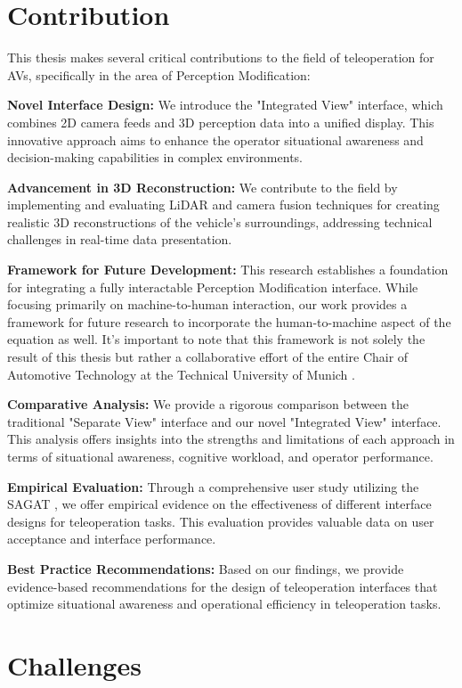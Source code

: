 \section{Contribution}
This thesis makes several critical contributions to the field of teleoperation for \acp{AV}, specifically in the area of Perception Modification:

\textbf{Novel Interface Design:}
We introduce the "Integrated View" interface, which combines 2D camera feeds and 3D perception data into a unified display. This innovative approach
aims to enhance the operator situational awareness and decision-making capabilities in complex environments.

\textbf{Advancement in 3D Reconstruction:}
We contribute to the field by implementing and evaluating LiDAR and camera fusion techniques for creating realistic 3D reconstructions of the vehicle's surroundings, addressing technical challenges in real-time data presentation.

\textbf{Framework for Future Development:}
This research establishes a foundation for
integrating a fully interactable Perception Modification interface. While focusing
primarily on machine-to-human interaction, our work provides a framework for future
research to incorporate the human-to-machine aspect of the equation as well. It's
important to note that this framework is not solely the result of this thesis but rather a collaborative effort of the entire Chair of Automotive Technology at the Technical
University of Munich \cite{tum_ftm}.

\textbf{Comparative Analysis:}
We provide a rigorous comparison between the traditional
"Separate View" interface and our novel "Integrated View" interface. This analysis offers
insights into the strengths and limitations of each approach in terms of situational
awareness, cognitive workload, and operator performance.

\textbf{Empirical Evaluation:}
Through a comprehensive user study utilizing the \ac{SAGAT} \cite{endsley1988sagat}, we offer empirical evidence on the effectiveness of different interface designs for teleoperation tasks. This evaluation provides
valuable data on user acceptance and interface performance.

\textbf{Best Practice Recommendations:}
Based on our findings, we provide evidence-based recommendations for the design of teleoperation interfaces that optimize situational awareness and operational efficiency in teleoperation tasks.

\section{Challenges}


